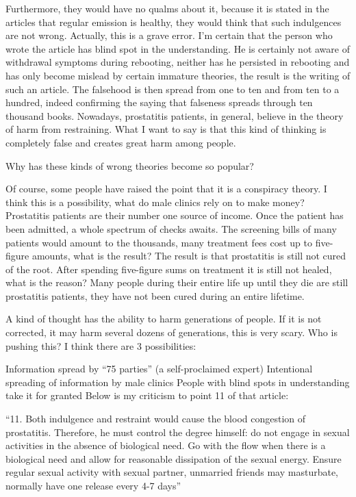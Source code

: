 \documentclass[
]{book}
\begin{document}
Furthermore, they would have no qualms about it, because it is stated in the articles that regular emission is healthy, they would think that such indulgences are not wrong. Actually, this is a grave error. I'm certain that the person who wrote the article has blind spot in the understanding. He is certainly not aware of withdrawal symptoms during rebooting, neither has he persisted in rebooting and has only become mislead by certain immature theories, the result is the writing of such an article. The falsehood is then spread from one to ten and from ten to a hundred, indeed confirming the saying that falseness spreads through ten thousand books. Nowadays, prostatitis patients, in general, believe in the theory of harm from restraining. What I want to say is that this kind of thinking is completely false and creates great harm among people.

Why has these kinds of wrong theories become so popular?

Of course, some people have raised the point that it is a conspiracy theory. I think this is a possibility, what do male clinics rely on to make money? Prostatitis patients are their number one source of income. Once the patient has been admitted, a whole spectrum of checks awaits. The screening bills of many patients would amount to the thousands, many treatment fees cost up to five-figure amounts, what is the result? The result is that prostatitis is still not cured of the root. After spending five-figure sums on treatment it is still not healed, what is the reason? Many people during their entire life up until they die are still prostatitis patients, they have not been cured during an entire lifetime.

A kind of thought has the ability to harm generations of people. If it is not corrected, it may harm several dozens of generations, this is very scary. Who is pushing this? I think there are 3 possibilities:

Information spread by ``75 parties'' (a self-proclaimed expert)
Intentional spreading of information by male clinics
People with blind spots in understanding take it for granted
Below is my criticism to point 11 of that article:

``11. Both indulgence and restraint would cause the blood congestion of prostatitis. Therefore, he must control the degree himself: do not engage in sexual activities in the absence of biological need. Go with the flow when there is a biological need and allow for reasonable dissipation of the sexual energy. Ensure regular sexual activity with sexual partner, unmarried friends may masturbate, normally have one release every 4-7 days''
\end{document}
